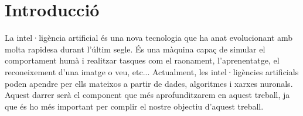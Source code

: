 \chapter{Introducció}
\label{c:intro}

La intel·ligència artificial és una nova tecnologia que ha anat evolucionant amb molta rapidesa durant l'últim segle. És una màquina capaç de simular el comportament humà i realitzar tasques com el raonament, l'aprenentatge, el reconeixement d'una imatge o veu, etc... Actualment, les intel·ligències artificials poden apendre per ells mateixos a partir de dades, algoritmes i xarxes nuronals. Aquest darrer serà el component que més aprofunditzarem en aquest treball, ja que és ho més important per complir el nostre objectiu d'aquest treball.
